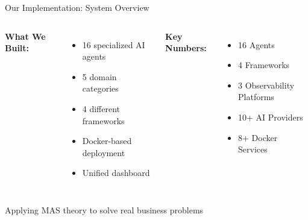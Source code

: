 \documentclass[aspectratio=169,11pt]{beamer}
\begin{document}
\begin{frame}{Our Implementation: System Overview}
\begin{columns}
\textbf{What We Built:}
\begin{itemize}
    \item 16 specialized AI agents
    \item 5 domain categories
    \item 4 different frameworks
    \item Docker-based deployment
    \item Unified dashboard
\end{itemize}

\textbf{Key Numbers:}
\begin{itemize}
    \item {} 16 Agents
    \item {} 4 Frameworks
    \item {} 3 Observability Platforms
    \item {} 10+ AI Providers
    \item {} 8+ Docker Services
\end{itemize}
\end{columns}

\vspace{0.3cm}
\begin{center}
\colorbox{green!20}{Applying MAS theory to solve real business problems}
\end{center}
\end{frame}
\end{document}
